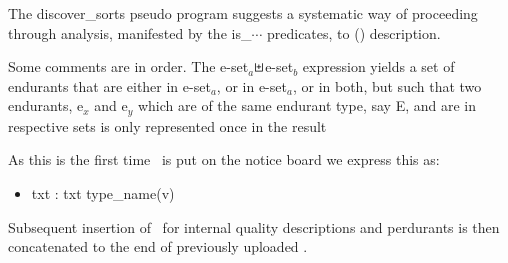\label{The Procedure}\label{A Domain Discovery Process, I}
 
\begynd
\pind The \textsf{discover\_sorts} pseudo program
\begynd
\pind suggests a systematic way of proceeding
\pind through analysis, manifested by the \textsf{is\_$\cdots$} predicates,
\pind to ({\RIGHTARROW}) description.
\afslut
\afslut

\begynd
\pind Some comments are in order.
\begynd
\pind The \textsf{e-set$_a$}$\sqcupplus$\textsf{e-set$_b$} expression
\pind yields a set of endurants that are either in \textsf{e-set$_a$},
      or in \textsf{e-set$_a$}, or in both,
\pind but such that two endurants, \textsf{e$_x$} and \textsf{e$_y$}
\pind which are of the same endurant\ysfchg{ } type, say \textsf{E}, 
\pind and are in respective sets is only represented once in the
      result
\afslut
                                \pos{\psno}{\mnewfoil}\HHHH

\pind As this is the first time \rsltxt\ is put on the notice board \nyl we express this as:
\begin{itemize}
\item \textsf{txt :{\EQ} txt {\UNION} {\LBRACKET}type\_name(v) {\MAPSTO} {\LANGLE}\rsltxt{\RANGLE}{\RBRACKET}}
\end{itemize}
\pind Subsequent insertion of \rsltxt\ \nyl for internal quality
descriptions and perdurants  \nyl is then concatenated to the end of
previously uploaded \rsltxt.
\afslut

\pos{\psno\vspace*{4mm}}{\mnewfoil \vspace*{-4mm}}

 \label{DiscoverySchema1}
\LLll
  
